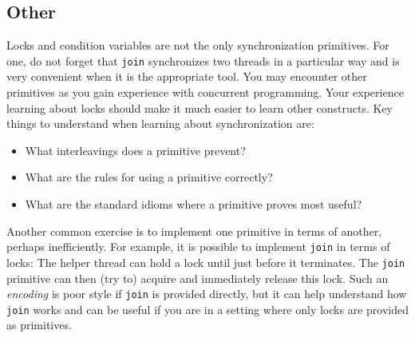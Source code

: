 \documentclass[10pt]{article}
\begin{document}
\subsection{Other}
\label{sec:other-other}

Locks and condition variables are not the only synchronization
primitives.  For one, do not forget that {\tt join} synchronizes two
threads in a particular way and is very convenient when it is the
appropriate tool.  You may encounter other primitives as you gain
experience with concurrent programming.  Your experience
learning about locks should make it much easier to learn other
constructs.  Key things to understand when learning about
synchronization are:
\begin{itemize}
\item What interleavings does a primitive prevent?
\item What are the rules for using a primitive correctly?
\item What are the standard idioms where a primitive proves most
  useful?
\end{itemize}

Another common exercise is to implement one primitive in terms of
another, perhaps inefficiently.  For example, it is possible to
implement {\tt join} in terms of locks: The helper thread can hold a lock
until just before it terminates.  The {\tt join} primitive can then
(try to) acquire and immediately release this lock.  Such an
\emph{encoding} is poor style if {\tt join} is provided directly, but
it can help understand how {\tt join} works and can be useful if you
are in a setting where only locks are provided as primitives.
\end{document}

